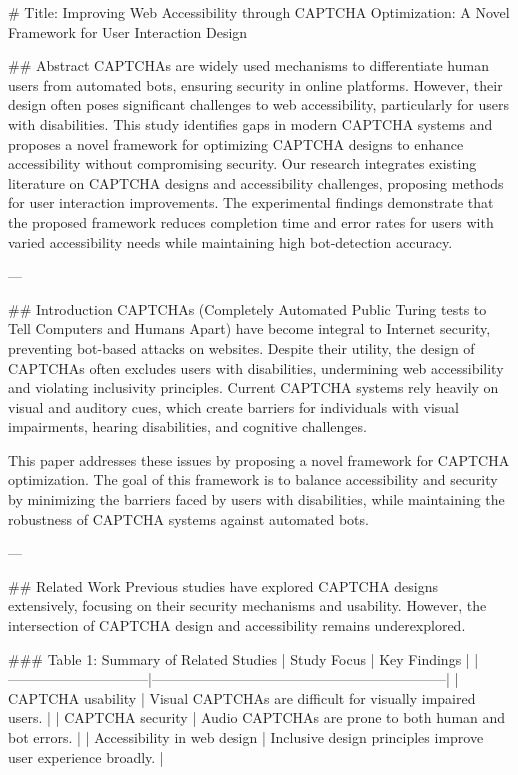# Title: Improving Web Accessibility through CAPTCHA Optimization: A Novel Framework for User Interaction Design

## Abstract
CAPTCHAs are widely used mechanisms to differentiate human users from automated bots, ensuring security in online platforms. However, their design often poses significant challenges to web accessibility, particularly for users with disabilities. This study identifies gaps in modern CAPTCHA systems and proposes a novel framework for optimizing CAPTCHA designs to enhance accessibility without compromising security. Our research integrates existing literature on CAPTCHA designs and accessibility challenges, proposing methods for user interaction improvements. The experimental findings demonstrate that the proposed framework reduces completion time and error rates for users with varied accessibility needs while maintaining high bot-detection accuracy.

---

## Introduction
CAPTCHAs (Completely Automated Public Turing tests to Tell Computers and Humans Apart) have become integral to Internet security, preventing bot-based attacks on websites. Despite their utility, the design of CAPTCHAs often excludes users with disabilities, undermining web accessibility and violating inclusivity principles. Current CAPTCHA systems rely heavily on visual and auditory cues, which create barriers for individuals with visual impairments, hearing disabilities, and cognitive challenges.

This paper addresses these issues by proposing a novel framework for CAPTCHA optimization. The goal of this framework is to balance accessibility and security by minimizing the barriers faced by users with disabilities, while maintaining the robustness of CAPTCHA systems against automated bots.

---

## Related Work
Previous studies have explored CAPTCHA designs extensively, focusing on their security mechanisms and usability. However, the intersection of CAPTCHA design and accessibility remains underexplored. 

### Table 1: Summary of Related Studies
| Study Focus                  | Key Findings                                                   |
|------------------------------|---------------------------------------------------------------|
| CAPTCHA usability            | Visual CAPTCHAs are difficult for visually impaired users.    |
| CAPTCHA security             | Audio CAPTCHAs are prone to both human and bot errors.        |
| Accessibility in web design  | Inclusive design principles improve user experience broadly.  |

